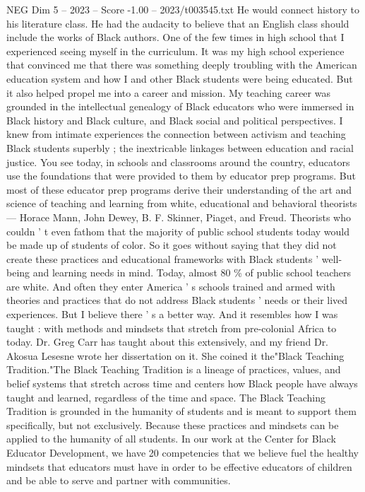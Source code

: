 \begin{textsample}{NEG Dim 5 – 2023 – Score -1.00 – 2023/t003545.txt}
He would connect history to his literature class.
He had the audacity to believe that an English class should include the works of Black authors.
One of the few times in high school that I experienced seeing myself in the curriculum.
It was my high school experience that convinced me that there was something deeply troubling with the American education system and how I and other Black students were being educated.
But it also helped propel me into a career and mission.
My teaching career was grounded in the intellectual genealogy of Black educators who were immersed in Black history and Black culture, and Black social and political perspectives.
I knew from intimate experiences the connection between activism and teaching Black students superbly ; the inextricable linkages between education and racial justice.
You see today, in schools and classrooms around the country, educators use the foundations that were provided to them by educator prep programs.
But most of these educator prep programs derive their understanding of the art and science of teaching and learning from white, educational and behavioral theorists — Horace Mann, John Dewey, B.
F.
Skinner, Piaget, and Freud.
Theorists who couldn ' t even fathom that the majority of public school students today would be made up of students of color.
So it goes without saying that they did not create these practices and educational frameworks with Black students ' well-being and learning needs in mind.
Today, almost 80 \% of public school teachers are white.
And often they enter America ' s schools trained and armed with theories and practices that do not address Black students ' needs or their lived experiences.
But I believe there ' s a better way.
And it resembles how I was taught : with methods and mindsets that stretch from pre-colonial Africa to today.
Dr.
Greg Carr has taught about this extensively, and my friend Dr.
Akosua Lesesne wrote her dissertation on it.
She coined it the"Black Teaching Tradition."The Black Teaching Tradition is a lineage of practices, values, and belief systems that stretch across time and centers how Black people have always taught and learned, regardless of the time and space.
The Black Teaching Tradition is grounded in the humanity of students and is meant to support them specifically, but not exclusively.
Because these practices and mindsets can be applied to the humanity of all students.
In our work at the Center for Black Educator Development, we have 20 competencies that we believe fuel the healthy mindsets that educators must have in order to be effective educators of children and be able to serve and partner with communities.

\end{textsample}
